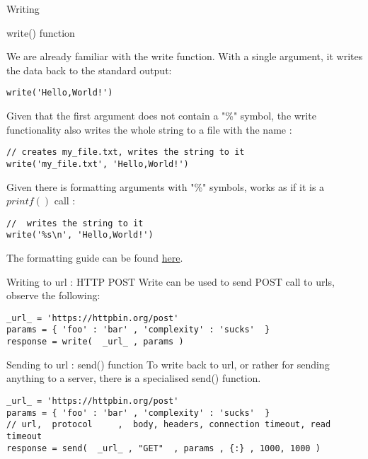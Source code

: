 \begin{section}{Writing}

\begin{subsection}{write() function}

We are already familiar with the write function.
With a single argument, it writes the data back to the standard output:

\begin{lstlisting}[style=JexlStyle]
write('Hello,World!')
\end{lstlisting}

Given that the first argument does not contain a "\%" symbol,
the write functionality also writes the whole string to a file
with the name :
\begin{lstlisting}[style=JexlStyle]
// creates my_file.txt, writes the string to it 
write('my_file.txt', 'Hello,World!')
\end{lstlisting}

Given there is formatting arguments with "\%" symbols, 
works as if it is a $printf()$ call :
\begin{lstlisting}[style=JexlStyle]
//  writes the string to it 
write('%s\n', 'Hello,World!')
\end{lstlisting}
The formatting guide can be found 
\href{https://sharkysoft.com/archive/printf/docs/javadocs/lava/clib/stdio/doc-files/specification.htm}{here}. 
\end{subsection}

\begin{subsection}{Writing to url : HTTP POST}
Write can be used to send POST call to urls, observe the following:
\begin{lstlisting}[style=JexlStyle]
_url_ = 'https://httpbin.org/post'
params = { 'foo' : 'bar' , 'complexity' : 'sucks'  }
response = write(  _url_ , params )
\end{lstlisting}
\end{subsection}

\begin{subsection}{Sending to url : send() function}
To write back to url, or rather for sending anything to a server,
there is a specialised send() function.

\begin{lstlisting}[style=JexlStyle]
_url_ = 'https://httpbin.org/post'
params = { 'foo' : 'bar' , 'complexity' : 'sucks'  }
// url,  protocol     ,  body, headers, connection timeout, read timeout  
response = send(  _url_ , "GET"  , params , {:} , 1000, 1000 )
\end{lstlisting}


\end{subsection}
\end{section}
